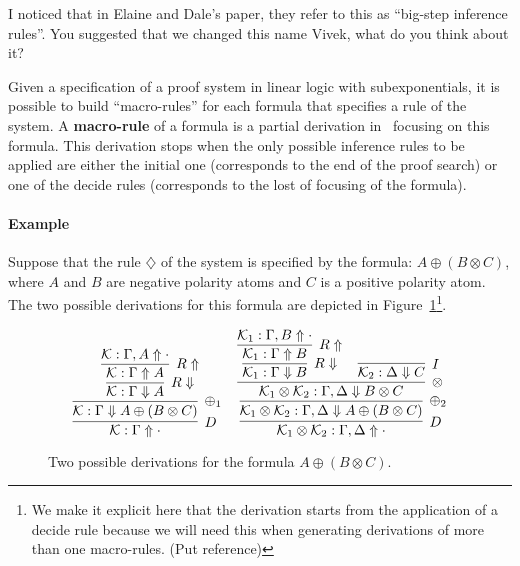 \begin{giselle}
I noticed that in Elaine and Dale's paper, they refer to this as ``big-step
inference rules''. You suggested that we changed this name Vivek, what do you
think about it?
\end{giselle}

Given a specification of a proof system in linear logic with subexponentials, it
is possible to build ``macro-rules'' for each formula that specifies a rule of
the system. A \textbf{macro-rule} of a formula is a partial derivation in
\sellf\ focusing on this formula. This derivation stops when the only possible
inference rules to be applied are either the initial one (corresponds to the end
of the proof search) or one of the decide rules (corresponds to the lost of
focusing of the formula).

\paragraph{Example} Suppose that the rule $\diamondsuit$ of the system is specified by
the formula: $A \oplus (B \otimes C)$, where $A$ and $B$ are negative polarity
atoms and $C$ is a positive polarity atom. The two
possible derivations for this formula are depicted in
Figure~\ref{fig:derivations}\footnote{We make it explicit here that the
derivation starts from the application of a decide rule because we will need
this when generating derivations of more than one macro-rules. (Put reference)}.

\begin{figure}
$$
\infer[D]{\mathcal{K} : \Gamma \Uparrow \cdot}
{
\infer[\oplus_1]{\mathcal{K} : \Gamma \Downarrow A \oplus (B \otimes
C)}{
  \infer[R\Downarrow]{\mathcal{K} : \Gamma \Downarrow A}
  {
    \infer[R\Uparrow]{\mathcal{K} : \Gamma \Uparrow A}
    {\mathcal{K} : \Gamma, A \Uparrow \cdot}
  }
}
}
\;\;\;\;
\infer[D]{\mathcal{K}_1 \otimes \mathcal{K}_2 : \Gamma, \Delta \Uparrow \cdot}
{
\infer[\oplus_2]{\mathcal{K}_1 \otimes \mathcal{K}_2 : \Gamma, \Delta \Downarrow A \oplus (B \otimes C)}
{
  \infer[\otimes]{\mathcal{K}_1 \otimes \mathcal{K}_2 : \Gamma, \Delta \Downarrow B \otimes C}
  {
    \infer[R\Downarrow]{\mathcal{K}_1 : \Gamma \Downarrow B}
      {
        \infer[R\Uparrow]{\mathcal{K}_1 : \Gamma \Uparrow B}{\mathcal{K}_1 :
        \Gamma, B \Uparrow \cdot}
      } \;\;\;\;
    \infer[I]{\mathcal{K}_2 : \Delta \Downarrow C}{}
  }
}
}
$$
\caption{Two possible derivations for the formula $A \oplus (B \otimes C)$.}
\label{fig:derivations}
\end{figure}

